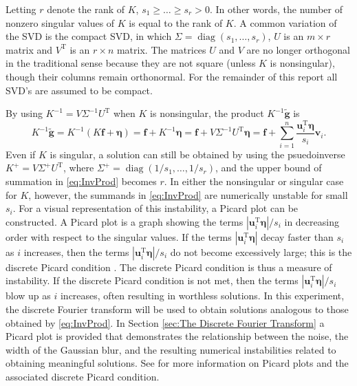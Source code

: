 \documentclass[12pt]{article}
\newcommand{\gnoise}{\widetilde{\mathbf{g}}}
\newcommand{\kmat}{K}	%
\newcommand{\fdis}{\mathbf{f}}
\newcommand{\trans}{\mathrm{T}}	%
\newcommand{\diag}{\operatorname{diag}}	%
\newcommand{\noise}{\bm{\eta}}	%
\newcommand{\singular}{s}	%
\newcommand{\LSV}{\mathbf{u}}	%
\newcommand{\RSV}{\mathbf{v}}	%
\begin{document}
Letting $r$ denote the rank of $\kmat$,  $\singular_1 \geq \ldots \geq \singular_r > 0$. In other words, the number of nonzero singular values of $\kmat$ is equal to the rank of $\kmat$.  A common variation of the SVD is the compact SVD, in which $\Sigma = \diag(\singular_1,\ldots,\singular_r)$, $U$ is an $m \times r$ matrix and $V^\trans$ is an $r \times n$ matrix. The matrices $U$ and $V$ are no longer orthogonal in the traditional sense because they are not square (unless $\kmat$ is nonsingular), though their columns remain orthonormal. For the remainder of this report all SVD's are assumed to be compact.  \par 
By using $\kmat^{-1} = V\Sigma^{-1}U^\trans$ when $\kmat$ is nonsingular, the product $\kmat^{-1}\gnoise$ is
\begin{equation}
\kmat^{-1}\gnoise = \kmat^{-1}\left(\kmat\fdis + \noise\right) = \fdis + \kmat^{-1}\noise = \fdis + V\Sigma^{-1}{U^\trans}\noise = \fdis + \sum_{i = 1}^n \frac{{\LSV^\trans_i}\noise}{\singular_i}\RSV_i. 
\label{eq:InvProd}
\end{equation}
Even if $\kmat$ is singular, a solution can still be obtained by using the psuedoinverse $\kmat^+ = V{\Sigma^+}U^\trans$, where $\Sigma^+ = \diag(1/\singular_1,\ldots,1/\singular_r)$, and the upper bound of summation in \eqref{eq:InvProd} becomes $r$. In either the nonsingular or singular case for $\kmat$, however, the summands in \eqref{eq:InvProd} are numerically unstable for small $\singular_i$. For a visual representation of this instability, a Picard plot can be constructed. A Picard plot is a graph showing the terms $|\LSV^\trans_i\noise|/\singular_i$ in decreasing order with respect to the singular values. If the terms $|\LSV^\trans_i\noise|$ decay faster than $\singular_i$ as $i$ increases, then the terms $|\LSV^\trans_i\noise|/\singular_i$ do not become excessively large; this is the discrete Picard condition \cite{ABT}. The discrete Picard condition is thus a measure of instability. If the discrete Picard condition is not met, then the terms $|\LSV^\trans_i\noise|/\singular_i$ blow up as $i$ increases, often resulting in worthless solutions. In this experiment, the discrete Fourier transform will be used to obtain solutions analogous to those obtained by \eqref{eq:InvProd}. In Section \ref{sec:The Discrete Fourier Transform} a Picard plot is provided that demonstrates the relationship between the noise, the width of the Gaussian blur, and the resulting numerical instabilities related to obtaining meaningful solutions. See \cite{Hansen1990} for more information on Picard plots and the associated discrete Picard condition. \par 
\end{document}
